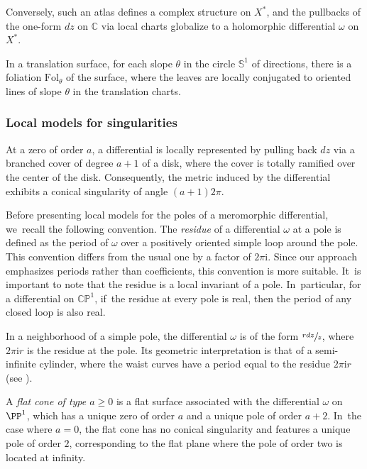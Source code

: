 Conversely, such an atlas defines a complex structure on $X^{\ast}$, and the pullbacks of the one-form $dz$ on $\mathbb{C}$ via local charts globalize to a holomorphic differential $\omega$ on $X^{\ast}$.

In a translation surface, for each slope $\theta$ in the circle $\mathbb{S}^{1}$ of directions, there is a foliation $\mathrm{Fol}_{\theta}$ of the surface, where the leaves are locally conjugated to oriented lines of slope $\theta$ in the translation charts.

\subsubsection{Local models for singularities}

At a zero of order $a$, a differential is locally represented by pulling back $dz$ via a branched cover of degree $a+1$ of a disk, where the cover is totally ramified over the center of the disk. Consequently, the metric induced by the differential exhibits a conical singularity of angle $(a+1)2\pi$.

Before presenting local models for the poles of a meromorphic differential, we~recall the following convention. The \textit{residue} of a differential $\omega$ at a pole is defined as the period of $\omega$ over a positively oriented simple loop around the pole. This convention differs from the usual one by a factor of $2\pi \mathrm{i}$. Since our approach emphasizes periods rather than coefficients, this convention is more suitable. It~is important to note that the residue is a local invariant of a pole. In~particular, for a differential on $\mathbb{CP}^{1}$, if~the residue at every pole is real, then the period of any closed loop is also real.

In a neighborhood of a simple pole, the differential $\omega$ is of the form $\sfrac{rdz}{z}$, where $2\pi \mathrm{i} r$ is the residue at the pole. Its geometric interpretation is that of a semi-infinite cylinder, where the waist curves have a period equal to the residue $2\pi \mathrm{i} r$ (see \cite[\S2.2]{Bo}).

A {\em flat cone of type $a\geq0$} is a flat surface associated with the differential $\omega$ on $\PP^{1}$, which has a unique zero of order $a$ and a unique pole of order $a+2$. In~the case where $a=0$, the flat cone has no conical singularity and features a unique pole of order $2$, corresponding to the flat plane where the pole of order two is located at infinity.

